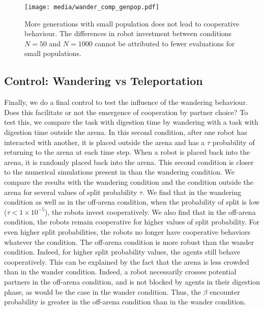 \documentclass[letterpaper]{article}
\begin{document}
\begin{figure}[tbhp]
    \begin{center}
        \texttt{[image: media/wander\_comp\_genpop.pdf]}
        \vskip 0.25cm
        \caption{More generations with small population does not lead to cooperative behaviour. The differences in robot investment between conditions $N=50$ and $N=1000$ cannot be attributed to fewer evaluations for small populations.
        }
        \label{fig:gencomp}
    \end{center}
\end{figure}


\subsection{Control: Wandering vs Teleportation}


Finally, we do a final control to test the influence of the wandering behaviour. Does this facilitate or not the emergence of cooperation by partner choice? %
To test this, we compare the task with digestion time by wandering with a task with digestion time outside the arena. In this second condition, after one robot has interacted with another, it is placed outside the arena and has a $\tau$ probability of returning to the arena at each time step. When a robot is placed back into the arena, it is randomly placed back into the arena. This second condition is closer to the numerical simulations present in \citet{Debove2015c} than the wandering condition. We compare the results with the wandering condition and the condition outside the arena for several values of split probability $\tau$. %
We find that in the wandering condition as well as in the off-arena condition, when the probability of split is low ($\tau < 1\times 10^{-5}$), the robots invest cooperatively. We also find that in the off-arena condition, the robots remain cooperative for higher values of split probability. For even higher split probabilities, the robots no longer have cooperative behaviors whatever the condition. %
The off-arena condition is more robust than the wander condition. Indeed, for higher split probability values, the agents still behave cooperatively. This can be explained by the fact that the arena is less crowded than in the wander condition. Indeed, a robot necessarily crosses potential partners in the off-arena condition, and is not blocked by agents in their digestion phase, as would be the case in the wander condition. Thus, the $\beta$ encounter probability is greater in the off-arena condition than in the wander condition. %
\end{document}
